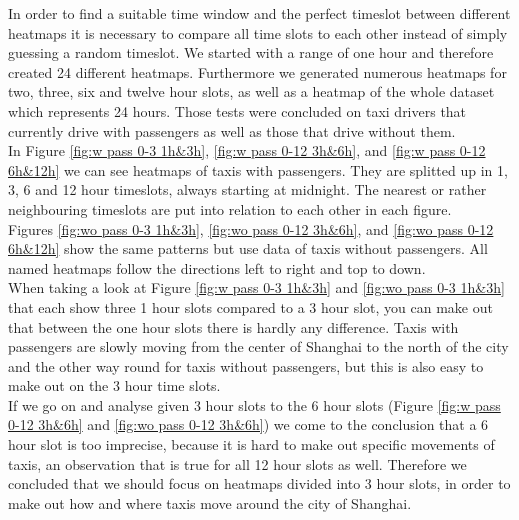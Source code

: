 \documentclass[11pt,conference,a4paper,twocolumns,romanappendices]{IEEEtran}
\begin{document}
In order to find a suitable time window and the perfect timeslot between different heatmaps it is necessary to compare all time slots to each other instead of simply guessing a random timeslot. We started with a range of one hour and therefore created 24 different heatmaps. Furthermore we generated numerous heatmaps for two, three, six and twelve hour slots, as well as a heatmap of the whole dataset which represents 24 hours. Those tests were concluded on taxi drivers that currently drive with passengers as well as those that drive without them.\\

In Figure \ref{fig:w pass 0-3 1h&3h}, \ref{fig:w pass 0-12 3h&6h}, and \ref{fig:w pass 0-12 6h&12h} we can see heatmaps of taxis with passengers. They are splitted up in 1, 3, 6 and 12 hour timeslots, always starting at midnight. The nearest or rather neighbouring timeslots are put into relation to each other in each figure.\\
Figures \ref{fig:wo pass 0-3 1h&3h}, \ref{fig:wo pass 0-12 3h&6h}, and \ref{fig:wo pass 0-12 6h&12h} show the same patterns but use data of taxis without passengers.
All named heatmaps follow the directions left to right and top to down.\\
When taking a look at Figure \ref{fig:w pass 0-3 1h&3h} and \ref{fig:wo pass 0-3 1h&3h} that each show three 1 hour slots compared to a 3 hour slot, you can make out that between the one hour slots there is hardly any difference. Taxis with passengers are slowly moving from the center of Shanghai to the north of the city and the other way round for taxis without passengers, but this is also easy to make out on the 3 hour time slots.\\
If we go on and analyse given 3 hour slots to the 6 hour slots (Figure \ref{fig:w pass 0-12 3h&6h} and \ref{fig:wo pass 0-12 3h&6h}) we come to the conclusion that a 6 hour slot is too imprecise, because it is hard to make out specific movements of taxis, an observation that is true for all 12 hour slots as well. Therefore we concluded that we should focus on heatmaps divided into 3 hour slots, in order to make out how and where taxis move around the city of Shanghai.
\end{document}
